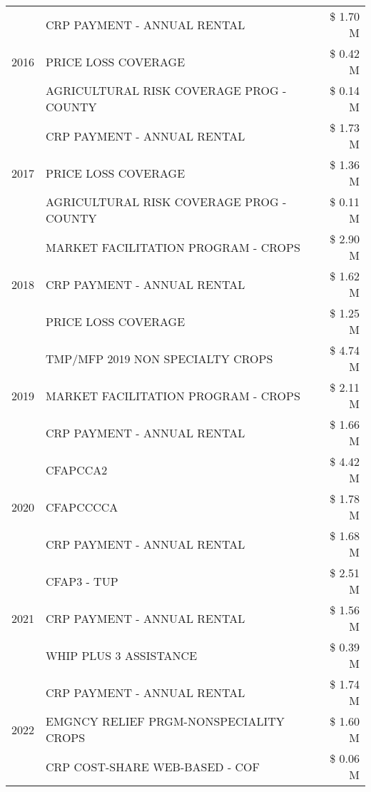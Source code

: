 \begin{tabular}{llr}
\cline{1-3}
\multirow[t]{3}{*}{2016} & CRP PAYMENT - ANNUAL RENTAL & \$ 1.70 M \\
 & PRICE LOSS COVERAGE & \$ 0.42 M \\
 & AGRICULTURAL RISK COVERAGE PROG - COUNTY & \$ 0.14 M \\
\cline{1-3}
\multirow[t]{3}{*}{2017} & CRP PAYMENT - ANNUAL RENTAL & \$ 1.73 M \\
 & PRICE LOSS COVERAGE & \$ 1.36 M \\
 & AGRICULTURAL RISK COVERAGE PROG - COUNTY & \$ 0.11 M \\
\cline{1-3}
\multirow[t]{3}{*}{2018} & MARKET FACILITATION PROGRAM - CROPS & \$ 2.90 M \\
 & CRP PAYMENT - ANNUAL RENTAL & \$ 1.62 M \\
 & PRICE LOSS COVERAGE & \$ 1.25 M \\
\cline{1-3}
\multirow[t]{3}{*}{2019} & TMP/MFP 2019 NON SPECIALTY CROPS & \$ 4.74 M \\
 & MARKET FACILITATION PROGRAM - CROPS & \$ 2.11 M \\
 & CRP PAYMENT - ANNUAL RENTAL & \$ 1.66 M \\
\cline{1-3}
\multirow[t]{3}{*}{2020} & CFAPCCA2 & \$ 4.42 M \\
 & CFAPCCCCA & \$ 1.78 M \\
 & CRP PAYMENT - ANNUAL RENTAL & \$ 1.68 M \\
\cline{1-3}
\multirow[t]{3}{*}{2021} & CFAP3 - TUP & \$ 2.51 M \\
 & CRP PAYMENT - ANNUAL RENTAL & \$ 1.56 M \\
 & WHIP PLUS 3 ASSISTANCE & \$ 0.39 M \\
\cline{1-3}
\multirow[t]{3}{*}{2022} & CRP PAYMENT - ANNUAL RENTAL & \$ 1.74 M \\
 & EMGNCY RELIEF PRGM-NONSPECIALITY CROPS & \$ 1.60 M \\
 & CRP COST-SHARE WEB-BASED - COF & \$ 0.06 M \\
\cline{1-3}
\bottomrule
\end{tabular}
